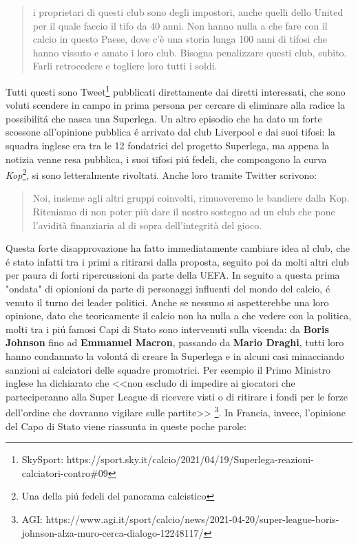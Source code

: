 \documentclass[
    corpo=12pt,
    oneside,
    evenboxes,
    tipotesi=triennale,
    stile=classica,
    oldstyle,
    autoretitolo,
    greek,
]{toptesi}
\begin{document}
\begin{interlinea}{1.5}
\begin{quote}
i proprietari di questi club sono degli impostori, anche quelli dello United per il quale faccio il tifo da 40 anni. Non hanno nulla a che fare con il 
calcio in questo Paese, dove c'è una storia lunga 100 anni di tifosi che hanno vissuto e amato i loro club. Bisogna penalizzare questi club, subito. 
Farli retrocedere e togliere loro tutti i soldi.\end{quote}
Tutti questi sono Tweet\footnote{SkySport: https://sport.sky.it/calcio/2021/04/19/Superlega-reazioni-calciatori-contro\#09} pubblicati direttamente dai diretti interessati, 
che sono voluti scendere in campo in prima persona per cercare di eliminare alla radice la possibilit\'a che nasca una Superlega.
Un altro episodio che ha dato un forte scossone all'opinione pubblica \'e arrivato dal club Liverpool e dai suoi tifosi: la squadra inglese era
tra le 12 fondatrici del progetto Superlega, ma appena la notizia venne resa pubblica, i suoi tifosi pi\'u fedeli, che compongono la curva 
\emph{Kop}\footnote{Una della pi\'u fedeli del panorama calcistico}, si sono letteralmente rivoltati. Anche loro tramite 
Twitter scrivono: \begin{quote}\small Noi, insieme agli altri gruppi coinvolti, rimuoveremo le bandiere dalla Kop. Riteniamo di non poter più dare
il nostro sostegno ad un club che pone l'avidità finanziaria al di sopra dell'integrità del gioco.\end{quote}
Questa forte disapprovazione ha fatto immediatamente cambiare idea al club, che \'e stato infatti tra i primi a ritirarsi dalla proposta, seguito
poi da molti altri club per paura di forti ripercussioni da parte della UEFA.\newline
In seguito a questa prima "ondata" di opionioni da parte di personaggi influenti del mondo del calcio, \'e venuto il turno dei leader politici.
Anche se nessuno si aspetterebbe una loro opinione, dato che teoricamente il calcio non ha nulla a che vedere con la politica, molti tra i pi\'u 
famosi Capi di Stato sono intervenuti sulla vicenda: da \textbf{Boris Johnson} fino ad \textbf{Emmanuel Macron}, passando da \textbf{Mario Draghi}, tutti loro hanno condannato
la volont\'a di creare la Superlega e in alcuni casi minacciando sanzioni ai calciatori delle squadre promotrici. Per esempio il Primo 
Ministro inglese ha dichiarato che <<non escludo di impedire ai giocatori che parteciperanno alla Super League di ricevere visti o di ritirare i fondi per le forze dell'ordine che dovranno vigilare sulle partite>>
\footnote{AGI: https://www.agi.it/sport/calcio/news/2021-04-20/super-league-boris-johnson-alza-muro-cerca-dialogo-12248117/}. In Francia, invece, l'opinione del Capo di Stato viene riassunta in queste poche parole:

\end{interlinea}
\end{document}
